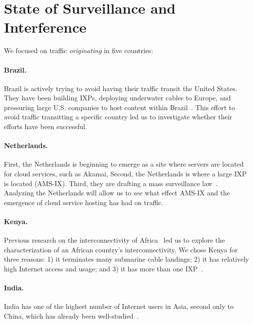 \section{State of Surveillance and Interference}
\label{surv}

We focused on traffic {\em originating} in five countries:

\paragraph{Brazil.} Brazil is actively trying to avoid having their
traffic transit the United States.  They have been building IXPs,
deploying underwater cables to Europe, and pressuring large
U.S. companies to host content within Brazil~\cite{brazil_history,
  brazil_break_from_US, brazil_conference, 
  brazil_conference2, brazil_human_rights, brazil_cable,
  brazil_us_companies, brazil_IXP1}.  This effort to avoid traffic
transitting a specific country led us to investigate whether their
efforts have been successful. 

\paragraph{Netherlands.}  First, the Netherlands is beginning to emerge
as a site where servers are located for cloud services, such as Akamai,
Second, the Netherlands is where a large IXP is located (AMS-IX). Third, they
are drafting a mass surveillance
law~\cite{netherlands_surveillance}. Analyzing the Netherlands will
allow us to see what effect AMS-IX and the emergence of cloud service
hosting has had on traffic. 

\paragraph{Kenya.} Previous research on the interconnectivity of
Africa~\cite{gupta2014peering, fanou2015diversity} led us to explore the
characterization of an African country's interconnectivity.  We chose
Kenya for three reasons: 1) it terminates many submarine cable landings;
2) it has relatively high Internet access and usage; and 3) it has more
than one IXP~\cite{kenya_nigeria, teams}. 

\paragraph{India.}  India has one of the highest number of Internet
users in Asia, second only to China, which has already been
well-studied~\cite{tsui2003panopticon, wang2010discourse}.  

